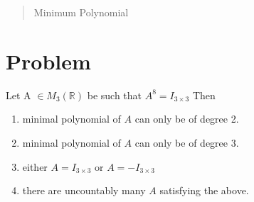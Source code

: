 \documentclass[journal,12pt,twocolumn]{IEEEtran}
\begin{document}
\author{\\
 \\
AI20RESCH14001\\
 }

\maketitle
\begin{abstract}
Minimum Polynomial
\end{abstract}

\section{Problem}
Let A $\in M_3 (\mathbb{R}) $ be such that $A^8 = I_{3 \times 3}$ Then
\begin{enumerate}
\item minimal polynomial of $A$ can only be of degree 2.
\item minimal polynomial of $A$ can only be of degree 3.
\item either $A = I_{3 \times 3}$ or $A = -I_{ 3 \times 3}$
\item there are uncountably many  $A$ satisfying the above.
\end{enumerate}
\end{document}
